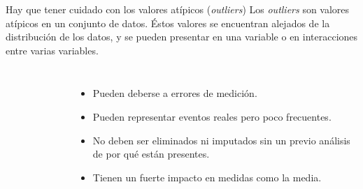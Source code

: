 \documentclass[aspectratio=169,handout]{beamer}
\begin{document}
    \begin{frame}{Hay que tener cuidado con los valores atípicos (\emph{outliers})}
        Los \emph{outliers} son valores atípicos en un conjunto de datos. Éstos valores se encuentran alejados de la distribución de los datos, y se pueden presentar en una variable o en interacciones entre varias variables.
        \pause
        \begin{columns}
            \begin{figure}[H]
                \centering
            \end{figure}
            
            \pause
            \begin{itemize}
                \item Pueden deberse a errores de medición.
                \item Pueden representar eventos reales pero poco frecuentes.
                \item No deben ser eliminados ni imputados sin un previo análisis de por qué están presentes.
                \item Tienen un fuerte impacto en medidas como la media.
            \end{itemize}
        \end{columns}
    \end{frame}
\end{document}
